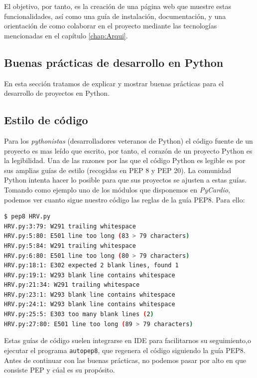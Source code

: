 El objetivo, por tanto, es la creación de una página web que muestre estas funcionalidades, así como una guía de instalación, documentación, y una orientación de como colaborar en el proyecto mediante las tecnologías mencionadas en el capítulo \ref{chap:Arqui}.

\subsection{Buenas prácticas de desarrollo en Python}
\label{subsec:bestPracticses}
En esta sección tratamos de explicar y mostrar buenas prácticas para el desarrollo de proyectos en Python.\\

\subsection*{Estilo de código}
\label{subsec:stylePython}
Para los \emph{pythonistas} (desarrolladores veteranos de Python) el código fuente de un proyecto es mas leído que escrito, por tanto, el corazón de un proyecto Python es la legibilidad. Una de las razones por las que el código Python es legible es por sus amplias guías de estilo (recogidas en PEP 8 y PEP 20). La comunidad Python intenta hacer lo posible para que sus proyectos se ajusten a estas guías. Tomando como ejemplo uno de los módulos que disponemos en \emph{PyCardio}, podemos ver cuanto sigue nuestro código las reglas de la guía PEP8. Para ello: 
\begin{lstlisting}[language=sh, caption=Ejemplo de PEP8 con \emph{PyCardio},label=pep8]
$ pep8 HRV.py
HRV.py:3:79: W291 trailing whitespace
HRV.py:5:80: E501 line too long (83 > 79 characters)
HRV.py:5:84: W291 trailing whitespace
HRV.py:6:80: E501 line too long (80 > 79 characters)
HRV.py:18:1: E302 expected 2 blank lines, found 1
HRV.py:19:1: W293 blank line contains whitespace
HRV.py:21:34: W291 trailing whitespace
HRV.py:23:1: W293 blank line contains whitespace
HRV.py:24:1: W293 blank line contains whitespace
HRV.py:25:5: E303 too many blank lines (2)
HRV.py:27:80: E501 line too long (89 > 79 characters)
\end{lstlisting}
Estas guías de código suelen integrarse en IDE para facilitarnos su seguimiento,o ejecutar el programa \texttt{autopep8}, que regenera el código siguiendo la guía PEP8. Antes de continuar con las buenas prácticas, no podemos pasar por alto en que consiste PEP y cúal es su propósito. \\
